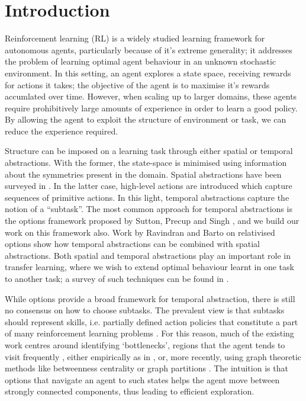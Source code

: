 \section{Introduction}
\label{sec:intro}

Reinforcement learning (RL) is a widely studied learning framework for
autonomous agents, particularly because of it's extreme generality; it
addresses the problem of learning optimal agent behaviour in an unknown
stochastic environment. In this setting, an agent explores a state
space, receiving rewards for actions it takes; the objective of the
agent is to maximise it's rewards accumlated over time. However, when
scaling up to larger domains, these agents require prohibitively large
amounts of experience in order to learn a good policy. By allowing the
agent to exploit the structure of environment or task, we can reduce the
experience required.

Structure can be imposed on a learning task through either spatial or
temporal abstractions. With the former, the state-space is minimised
using information about the symmetries present in the domain. Spatial
abstractions have been surveyed in \cite{Li2006}. In the latter case,
high-level actions are introduced which capture sequences of primitive
actions. In this light, temporal abstractions capture the notion of
a ``subtask''. The most common approach for temporal abstractions is the
options framework proposed by Sutton, Precup and Singh
\cite{SuttonPrecupSingh1999}, and we build our work on this framework
also. Work by Ravindran and Barto on relativised options
\cite{Ravindran2003} show how temporal abstractions can be combined with
spatial abstractions.  Both spatial and temporal abstractions play an
important role in transfer learning, where we wish to extend optimal
behaviour learnt in one task to another task; a survey of such
techniques can be found in \cite{Taylor2009a}.

While options provide a broad framework for temporal abstraction, there
is still no consensus on how to choose subtasks. The prevalent view is
that subtasks should represent skills, i.e. partially defined action
policies that constitute a part of many reinforcement learning problems
\cite{Thrun1995}. For this reason, much of the existing work centres
around identifying `bottlenecks', regions that the agent tends to visit
frequently \cite{McGovern2001}, either empirically as in
\cite{McGovern2001}, or, more recently, using graph theoretic methods
like betweenness centrality \cite{Simsek2008} or graph partitions
\cite{Menache2002}. The intuition is that options that navigate an agent
to such states helps the agent move between strongly connected
components, thus leading to efficient exploration. 

